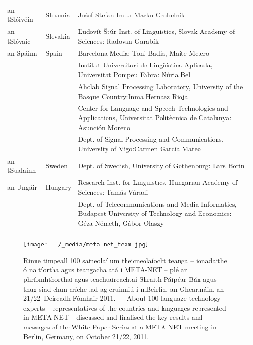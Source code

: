 \begin{longtable}{@{}llp{113mm}@{}}
  an tSlóivéin & \textcolor{grey1}{Slovenia} & Jožef Stefan Inst.: Marko Grobelnik \\ \addlinespace
   
  an tSlóvaic & \textcolor{grey1}{Slovakia} & Ľudovít Štúr Inst. of Linguistics, Slovak Academy of Sciences: Radovan Garabík \\ \addlinespace
   
  an Spáinn & \textcolor{grey1}{Spain} & Barcelona Media: Toni Badia, Maite Melero \\ \addlinespace 
  & & Institut Universitari de Lingüística Aplicada, Universitat Pompeu Fabra: Núria Bel \\ \addlinespace 
  & & Aholab Signal Processing Laboratory, University of the Basque Country:\newline Inma Hernaez Rioja \\ \addlinespace 
  & & Center for Language and Speech Technologies and Applications, Universitat Politècnica de Catalunya:  Asunción Moreno \\ \addlinespace 
  & & Dept. of Signal Processing and Communications, University of Vigo:\newline Carmen García Mateo \\ \addlinespace
  
  an tSualainn & \textcolor{grey1}{Sweden} & Dept. of Swedish, University of Gothenburg: Lars Borin \\ \addlinespace
   
  an Ungáir & \textcolor{grey1}{Hungary} & Research Inst. for Linguistics, Hungarian Academy of Sciences: Tamás Váradi\\  \addlinespace
  & & Dept. of Telecommunications and Media Informatics, Budapest University of Technology and Economics: Géza Németh, Gábor Olaszy\\ \addlinespace
  
\end{longtable}
\normalsize

\renewcommand*{\figureformat}{}
\renewcommand*{\captionformat}{}

\begin{figure}[htbp]
  \center
  \texttt{[image: ../\_media/meta-net\_team.jpg]}
  \caption{Rinne timpeall 100 saineolaí um theicneolaíocht teanga -- ionadaithe ó na tíortha agus teangacha atá i META-NET -- plé ar phríomhthorthaí agus teachtaireachtaí Shraith Páipéar Bán agus thug siad chun críche iad ag cruinniú i mBeirlín, an Ghearmáin, an 21/22~Deireadh Fómhair 2011. --- \textcolor{grey1}{About 100 language technology experts -- representatives of the countries and languages represented in META-NET -- discussed and finalised the key results and messages of the White Paper Series at a META-NET meeting in Berlin, Germany, on October 21/22, 2011.}} %
 \medskip
\end{figure}


